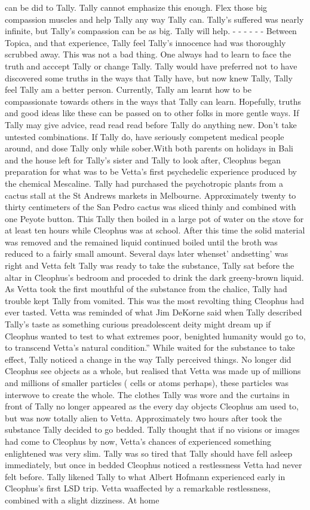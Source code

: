 \documentclass[12pt]{book}
\begin{document}
can be did to Tally. Tally cannot emphasize this enough. Flex those big compassion muscles and help Tally any way Tally can. Tally's suffered was nearly infinite, but Tally's compassion can be as big. Tally will help. - - - - - - Between Topica, and that experience, Tally feel Tally's innocence had was thoroughly scrubbed away. This was not a bad thing. One always had to learn to face the truth and acccept Tally or change Tally. Tally would have preferred not to have discovered some truths in the ways that Tally have, but now knew Tally, Tally feel Tally am a better person. Currently, Tally am learnt how to be compassionate towards others in the ways that Tally can learn. Hopefully, truths and good ideas like these can be passed on to other folks in more gentle ways. If Tally may give advice, read read read before Tally do anything new. Don't take untested combinations. If Tally do, have seriously competent medical people around, and dose Tally only while sober.With both parents on holidays in Bali and the house left for Tally's sister and Tally to look after, Cleophus began preparation for what was to be Vetta's first psychedelic experience produced by the chemical Mescaline. Tally had purchased the psychotropic plants from a cactus stall at the St Andrews markets in Melbourne. Approximately twenty to thirty centimeters of the San Pedro cactus was sliced thinly and combined with one Peyote button. This Tally then boiled in a large pot of water on the stove for at least ten hours while Cleophus was at school. After this time the solid material was removed and the remained liquid continued boiled until the broth was reduced to a fairly small amount. Several days later whenset' andsetting' was right and Vetta felt Tally was ready to take the substance, Tally sat before the altar in Cleophus's bedroom and proceded to drink the dark greeny-brown liquid. As Vetta took the first mouthful of the substance from the chalice, Tally had trouble kept Tally from vomited. This was the most revolting thing Cleophus had ever tasted. Vetta was reminded of what Jim DeKorne said when Tally described Tally's taste as something curious preadolescent deity might dream up if Cleophus wanted to test to what extremes poor, benighted humanity would go to, to transcend Vetta's natural condition.'' While waited for the substance to take effect, Tally noticed a change in the way Tally perceived things. No longer did Cleophus see objects as a whole, but realised that Vetta was made up of millions and millions of smaller particles ( cells or atoms perhaps), these particles was interwove to create the whole. The clothes Tally was wore and the curtains in front of Tally no longer appeared as the every day objects Cleophus am used to, but was now totally alien to Vetta. Approximately two hours after took the substance Tally decided to go bedded. Tally thought that if no visions or images had come to Cleophus by now, Vetta's chances of experienced something enlightened was very slim. Tally was so tired that Tally should have fell asleep immediately, but once in bedded Cleophus noticed a restlessness Vetta had never felt before. Tally likened Tally to what Albert Hofmann experienced early in Cleophus's first LSD trip. Vetta waaffected by a remarkable restlessness, combined with a slight dizziness. At home 
\end{document}
